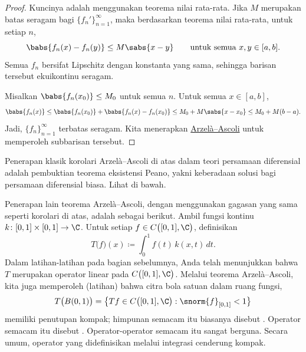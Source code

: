 \begin{proof}
Kuncinya adalah menggunakan teorema nilai rata-rata.  Jika $M$ merupakan batas seragam bagi
$\{ f_n' \}_{n=1}^\infty$, maka berdasarkan teorema nilai rata-rata, untuk setiap $n$,
\begin{equation*}
\babs{f_n(x)-f_n(y)} \leq M \sabs{x-y} \qquad \text{untuk semua } x,y \in [a,b].
\end{equation*}
Semua $f_n$ bersifat Lipschitz dengan konstanta yang sama, sehingga
barisan tersebut
ekuikontinu seragam.

Misalkan $\babs{f_n(x_0)} \leq M_0$ untuk semua $n$.
Untuk semua $x \in [a,b]$,
\begin{equation*}
\babs{f_n(x)} \leq \babs{f_n(x_0)}+ \babs{f_n(x)-f_n(x_0)} \leq M_0+ M \sabs{x-x_0}
\leq M_0 + M(b-a) .
\end{equation*}
Jadi, $\{ f_n \}_{n=1}^\infty$ terbatas seragam.
Kita menerapkan \hyperref[thm:arzelaascoli]{Arzel\`a--Ascoli} untuk memperoleh subbarisan tersebut.
\end{proof}

Penerapan klasik korolari Arzel\`a--Ascoli di atas
dalam teori persamaan
diferensial adalah pembuktian teorema eksistensi
Peano, yakni keberadaan solusi bagi persamaan diferensial
biasa.  Lihat  di bawah.

\medskip

Penerapan lain teorema Arzel\`a--Ascoli, dengan menggunakan gagasan yang sama seperti
korolari di atas, adalah sebagai berikut.
Ambil fungsi kontinu $k \colon [0,1] \times [0,1] \to \C$.
Untuk setiap $f \in C\bigl([0,1],\C\bigr)$, definisikan
\begin{equation*}
T\bigl(f\bigr)(x) \coloneqq  \int_0^1 f(t) \, k(x,t)\,dt .
\end{equation*}
Dalam latihan-latihan pada bagian sebelumnya, Anda telah menunjukkan bahwa
$T$ merupakan operator linear pada $C\bigl([0,1],\C\bigr)$.
Melalui teorema Arzel\`a--Ascoli, kita juga memperoleh (latihan) bahwa
citra bola satuan dalam ruang fungsi,
\begin{equation*}
T\bigl( B(0,1) \bigr) = 
\bigl\{
Tf \in C\bigl([0,1],\C\bigr) :  
\snorm{f}_{[0,1]} < 1
\bigr\}
\end{equation*}
memiliki penutupan kompak; himpunan semacam itu biasanya disebut
\emph{}.
Operator semacam itu disebut \emph{}.
Operator-operator semacam itu sangat berguna.  Secara umum, operator yang didefinisikan melalui
integrasi cenderung kompak.

